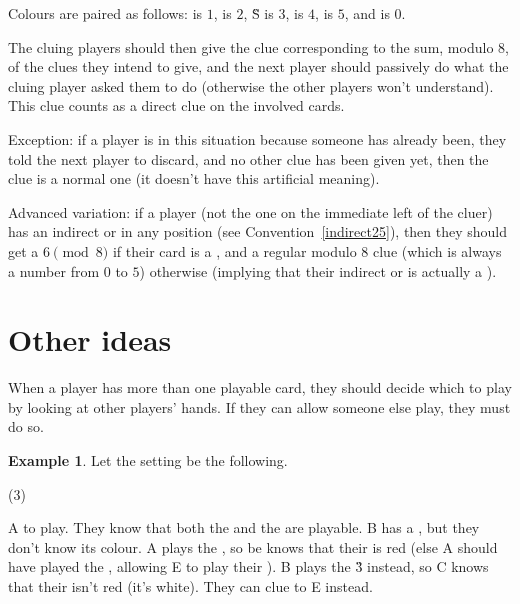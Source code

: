 \documentclass[a4paper]{article}
\theoremstyle{plain}
\theoremstyle{definition}
\newtheorem{example}[theorem]{Example}
\begin{document}
Colours are paired as follows:  is $1$,  is $2$, \G{S} is $3$,  is $4$,  is $5$, and  is $0$.

The cluing players should then give the clue corresponding to the sum, modulo 8, of the clues they intend to give, and the next player should passively do what the cluing player asked them to do (otherwise the other players won't understand). This clue counts as a direct clue on the involved cards.

Exception: if a player is in this situation because someone has already been, they told the next player to discard, and no other clue has been given yet, then the clue is a normal one (it doesn't have this artificial meaning).

Advanced variation: if a player (not the one on the immediate left of the cluer) has an indirect  or  in any position (see Convention~\ref{indirect25}), then they should get a $6 \pmod 8$ if their card is a , and a regular modulo $8$ clue (which is always a number from $0$ to $5$) otherwise (implying that their indirect  or  is actually a ).

\section{Other ideas}

When a player has more than one playable card, they should decide which to play by looking at other players' hands. If they can allow someone else play, they must do so.

\begin{example}
	
	Let the setting be the following.
	
	\begin{tasks}(3)
		\task[+]      
		\task[A]    
		\task[B]    
		\task[C]    
		\task[D]    
		\task[E]    
	\end{tasks}
	
	A to play. They know that both the  and the  are playable. B has a , but they don't know its colour. A plays the , so be knows that their  is red (else A should have played the , allowing E to play their ). B plays the \G{3} instead, so C knows that their  isn't red (it's white). They can clue  to E instead.
\end{example}
\end{document}
